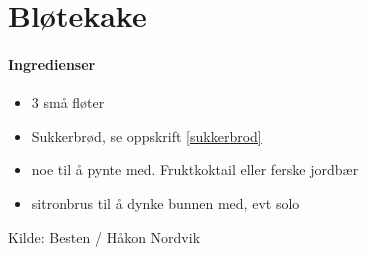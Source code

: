\section{﻿Bløtekake}


\paragraph{Ingredienser}
\begin{itemize}[noitemsep]
	\item 3 små fløter
	\item Sukkerbrød, se oppskrift \ref{sukkerbrod}
	\item noe til å pynte med. Fruktkoktail eller ferske jordbær
	\item sitronbrus til å dynke bunnen med, evt solo
\end{itemize}


Kilde: Besten / Håkon Nordvik
